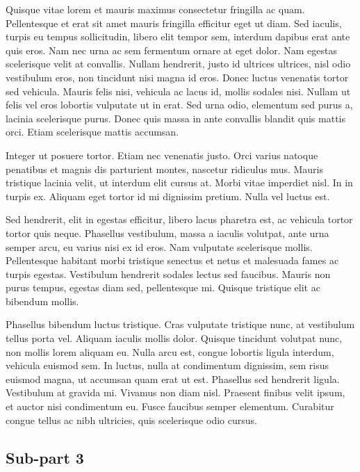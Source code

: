 \documentclass[a4paper,15pt]{article}
\begin{document}
Quisque vitae lorem et mauris maximus consectetur fringilla ac quam. Pellentesque et erat sit amet mauris fringilla efficitur eget ut diam. Sed iaculis, turpis eu tempus sollicitudin, libero elit tempor sem, interdum dapibus erat ante quis eros. Nam nec urna ac sem fermentum ornare at eget dolor. Nam egestas scelerisque velit at convallis. Nullam hendrerit, justo id ultrices ultrices, nisl odio vestibulum eros, non tincidunt nisi magna id eros. Donec luctus venenatis tortor sed vehicula. Mauris felis nisi, vehicula ac lacus id, mollis sodales nisi. Nullam ut felis vel eros lobortis vulputate ut in erat. Sed urna odio, elementum sed purus a, lacinia scelerisque purus. Donec quis massa in ante convallis blandit quis mattis orci. Etiam scelerisque mattis accumsan.

Integer ut posuere tortor. Etiam nec venenatis justo. Orci varius natoque penatibus et magnis dis parturient montes, nascetur ridiculus mus. Mauris tristique lacinia velit, ut interdum elit cursus at. Morbi vitae imperdiet nisl. In in turpis ex. Aliquam eget tortor id mi dignissim pretium. Nulla vel luctus est.

Sed hendrerit, elit in egestas efficitur, libero lacus pharetra est, ac vehicula tortor tortor quis neque. Phasellus vestibulum, massa a iaculis volutpat, ante urna semper arcu, eu varius nisi ex id eros. Nam vulputate scelerisque mollis. Pellentesque habitant morbi tristique senectus et netus et malesuada fames ac turpis egestas. Vestibulum hendrerit sodales lectus sed faucibus. Mauris non purus tempus, egestas diam sed, pellentesque mi. Quisque tristique elit ac bibendum mollis.

Phasellus bibendum luctus tristique. Cras vulputate tristique nunc, at vestibulum tellus porta vel. Aliquam iaculis mollis dolor. Quisque tincidunt volutpat nunc, non mollis lorem aliquam eu. Nulla arcu est, congue lobortis ligula interdum, vehicula euismod sem. In luctus, nulla at condimentum dignissim, sem risus euismod magna, ut accumsan quam erat ut est. Phasellus sed hendrerit ligula. Vestibulum at gravida mi. Vivamus non diam nisl. Praesent finibus velit ipsum, et auctor nisi condimentum eu. Fusce faucibus semper elementum. Curabitur congue tellus ac nibh ultricies, quis scelerisque odio cursus.

\newpage

\subsection{Sub-part 3}
\end{document}
